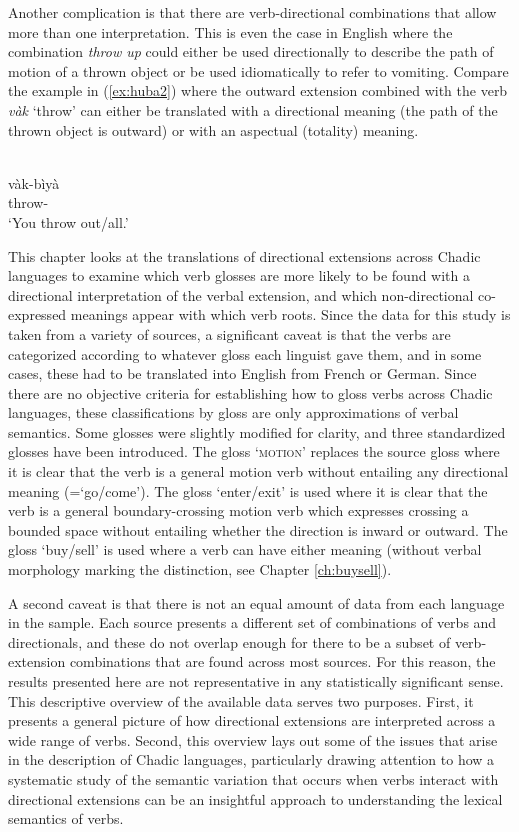 Another complication is that there are verb-directional combinations that allow more than one interpretation. This is even the case in English where the combination \textit{throw up} could either be used directionally to describe the path of motion of a thrown object or be used idiomatically to refer to vomiting. Compare the example in (\ref{ex:huba2}) where the outward extension combined with the verb \textit{vàk} `throw' can either be translated with a directional meaning (the path of the thrown object is outward) or with an aspectual (totality) meaning. 

\ea\label{ex:huba2}
 \\
\gll vàk-bìyà	 \\
throw- \\
\glt `You throw out/all.'
\z 

This chapter looks at the translations of directional extensions across Chadic languages to examine which verb glosses are more likely to be found with a directional interpretation of the verbal extension, and which non-directional co-expressed meanings appear with which verb roots. Since the data for this study is taken from a variety of sources, a significant caveat is that the verbs are categorized according to whatever gloss each linguist gave them, and in some cases, these had to be translated into English from French or German. Since there are no objective criteria for establishing how to gloss verbs across Chadic languages, these classifications by gloss are only approximations of verbal semantics. Some glosses were slightly modified for clarity, and three standardized glosses have been introduced. The gloss `\textsc{motion}' replaces the source gloss where it is clear that the verb is a general motion verb without entailing any directional meaning (=`go/come'). The gloss `enter/exit' is used where it is clear that the verb is a general boundary-crossing motion verb which expresses crossing a bounded space without entailing whether the direction is inward or outward. The gloss `buy/sell' is used where a verb can have either meaning (without verbal morphology marking the distinction, see Chapter \ref{ch:buysell}).  

A second caveat is that there is not an equal amount of data from each language in the sample. Each source presents a different set of combinations of verbs and directionals, and these do not overlap enough for there to be a subset of verb-extension combinations that are found across most sources. For this reason, the results presented here are not representative in any statistically significant sense. This descriptive overview of the available data serves two purposes. First, it presents a general picture of how directional extensions are interpreted across a wide range of verbs. Second, this overview lays out some of the issues that arise in the description of Chadic languages, particularly drawing attention to how a systematic study of the semantic variation that occurs when verbs interact with directional extensions can be an insightful approach to understanding the lexical semantics of verbs. 

